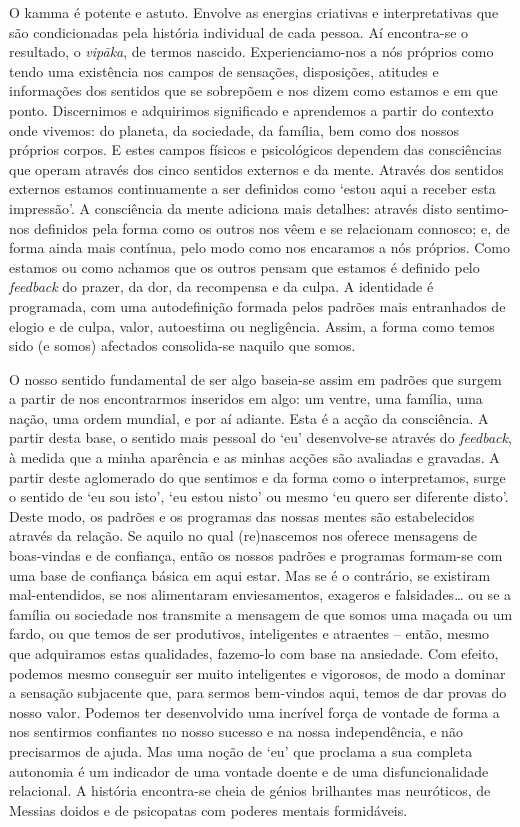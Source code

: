 O kamma é potente e astuto. Envolve as energias criativas e interpretativas que são condicionadas pela história individual de cada pessoa. Aí encontra-se o resultado, o \emph{vipāka}, de termos nascido. Experienciamo-nos a nós próprios como tendo uma existência nos campos de sensações, disposições, atitudes e informações dos sentidos que se sobrepõem e nos dizem como estamos e em que ponto. Discernimos e adquirimos significado e aprendemos a partir do contexto onde vivemos: do planeta, da sociedade, da família, bem como dos nossos próprios corpos. E estes campos físicos e psicológicos dependem das consciências que operam através dos cinco sentidos externos e da mente. Através dos sentidos externos estamos continuamente a ser definidos como `estou aqui a receber esta impressão'. A consciência da mente adiciona mais detalhes: através disto sentimo-nos definidos pela forma como os outros nos vêem e se relacionam connosco; e, de forma ainda mais contínua, pelo modo como nos encaramos a nós próprios. Como estamos ou como achamos que os outros pensam que estamos é definido pelo \emph{feedback} do prazer, da dor, da recompensa e da culpa. A identidade é programada, com uma autodefinição formada pelos padrões mais entranhados de elogio e de culpa, valor, autoestima ou negligência. Assim, a forma como temos sido (e somos) afectados consolida-se naquilo que somos.

O nosso sentido fundamental de ser algo baseia-se assim em padrões que surgem a partir de nos encontrarmos inseridos em algo: um ventre, uma família, uma nação, uma ordem mundial, e por aí adiante. Esta é a acção da consciência. A partir desta base, o sentido mais pessoal do `eu' desenvolve-se através do \emph{feedback}, à medida que a minha aparência e as minhas acções são avaliadas e gravadas. A partir deste aglomerado do que sentimos e da forma como o interpretamos, surge o sentido de `eu sou isto', `eu estou nisto' ou mesmo `eu quero ser diferente disto'. Deste modo, os padrões e os programas das nossas mentes são estabelecidos através da relação. Se aquilo no qual (re)nascemos nos oferece mensagens de boas-vindas e de confiança, então os nossos padrões e programas formam-se com uma base de confiança básica em aqui estar. Mas se é o contrário, se existiram mal-entendidos, se nos alimentaram enviesamentos, exageros e falsidades\ldots{} ou se a família ou sociedade nos transmite a mensagem de que somos uma maçada ou um fardo, ou que temos de ser produtivos, inteligentes e atraentes -- então, mesmo que adquiramos estas qualidades, fazemo-lo com base na ansiedade. Com efeito, podemos mesmo conseguir ser muito inteligentes e vigorosos, de modo a dominar a sensação subjacente que, para sermos bem-vindos aqui, temos de dar provas do nosso valor. Podemos ter desenvolvido uma incrível força de vontade de forma a nos sentirmos confiantes no nosso sucesso e na nossa independência, e não precisarmos de ajuda. Mas uma noção de `eu' que proclama a sua completa autonomia é um indicador de uma vontade doente e de uma disfuncionalidade relacional. A história encontra-se cheia de génios brilhantes mas neuróticos, de Messias doidos e de psicopatas com poderes mentais formidáveis.

